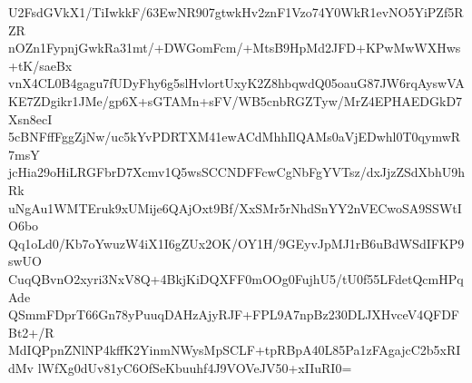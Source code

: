U2FsdGVkX1/TiIwkkF/63EwNR907gtwkHv2znF1Vzo74Y0WkR1evNO5YiPZf5RZR
nOZn1FypnjGwkRa31mt/+DWGomFcm/+MtsB9HpMd2JFD+KPwMwWXHws+tK/saeBx
vnX4CL0B4gagu7fUDyFhy6g5slHvlortUxyK2Z8hbqwdQ05oauG87JW6rqAyswVA
KE7ZDgikr1JMe/gp6X+sGTAMn+sFV/WB5cnbRGZTyw/MrZ4EPHAEDGkD7Xsn8ecI
5cBNFffFggZjNw/uc5kYvPDRTXM41ewACdMhhIlQAMs0aVjEDwhl0T0qymwR7msY
jcHia29oHiLRGFbrD7Xcmv1Q5wsSCCNDFFcwCgNbFgYVTsz/dxJjzZSdXbhU9hRk
uNgAu1WMTEruk9xUMije6QAjOxt9Bf/XxSMr5rNhdSnYY2nVECwoSA9SSWtIO6bo
Qq1oLd0/Kb7oYwuzW4iX1I6gZUx2OK/OY1H/9GEyvJpMJ1rB6uBdWSdIFKP9swUO
CuqQBvnO2xyri3NxV8Q+4BkjKiDQXFF0mOOg0FujhU5/tU0f55LFdetQcmHPqAde
QSmmFDprT66Gn78yPuuqDAHzAjyRJF+FPL9A7npBz230DLJXHvceV4QFDFBt2+/R
MdIQPpnZNlNP4kffK2YinmNWysMpSCLF+tpRBpA40L85Pa1zFAgajcC2b5xRIdMv
lWfXg0dUv81yC6OfSeKbuuhf4J9VOVeJV50+xIIuRI0=
